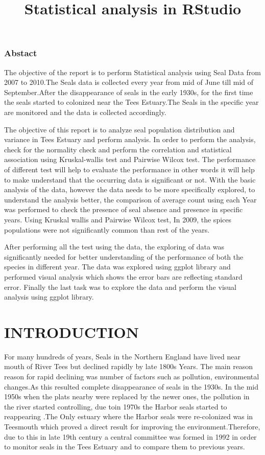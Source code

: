 \documentclass[
]{article}
\title{Statistical analysis in RStudio}
\author{}
\date{\vspace{-2.5em}}
\begin{document}
\maketitle

{
\setcounter{tocdepth}{2}
\tableofcontents
}
\hypertarget{abstact}{%
\subsubsection{Abstact}\label{abstact}}

The objective of the report is to perform Statistical analysis using
Seal Data from 2007 to 2010.The Seals data is collected every year from
mid of June till mid of September.After the disappearance of seals in
the early 1930s, for the first time the seals started to colonized near
the Tees Estuary.The Seals in the specific year are monitored and the
data is collected accordingly.

The objective of this report is to analyze seal population distribution
and variance in Tees Estuary and perform analysis. In order to perform
the analysis, check for the normality check and perform the correlation
and statistical association using Kruskal-wallis test and Pairwise
Wilcox test. The performance of different test will help to evaluate the
performance in other words it will help to make understand that the
occurring data is significant or not. With the basic analysis of the
data, however the data needs to be more specifically explored, to
understand the analysis better, the comparison of average count using
each Year was performed to check the presence of seal absence and
presence in specific years. Using Kruskal wallis and Pairwise Wilcox
test, In 2009, the spices populations were not significantly common than
rest of the years.

After performing all the test using the data, the exploring of data was
significantly needed for better understanding of the performance of both
the species in different year. The data was explored using ggplot
library and performed visual analysis which shows the error bars are
reflecting standard error. Finally the last task was to explore the data
and perform the visual analysis using ggplot library.

\hypertarget{introduction}{%
\section{INTRODUCTION}\label{introduction}}

For many hundreds of years, Seals in the Northern England have lived
near mouth of River Tees but declined rapidly by late 1800s Years. The
main reason reason for rapid declining was number of factors such as
pollution, environmental changes.As this resulted complete disappearance
of seals in the 1930s. In the mid 1950s when the plats nearby were
replaced by the newer ones, the pollution in the river started
controlling, due toin 1970s the Harbor seals started to reappearing .The
Only estuary where the Harbor seals were re-colonized was in Teesmouth
which proved a direct result for improving the environment.Therefore,
due to this in late 19th century a central committee was formed in 1992
in order to monitor seals in the Tees Estuary and to compare them to
previous years.
\end{document}
